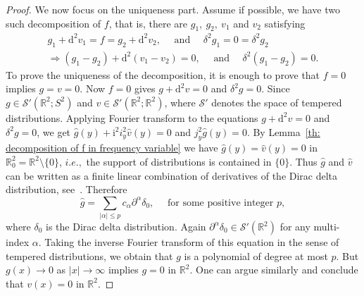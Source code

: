\documentclass[11pt]{article}
\newcommand{\I}{\mathrm{i}}
\newcommand{\D}{\mathrm{d}}
\newcommand{\PD}{\partial}
\newcommand{\Rb}{\mathbb{R}}
\renewcommand{\d}{\mathrm{d}}
\begin{document}
\begin{proof}
 We now focus on the uniqueness part.
 Assume if possible, we have two such decomposition of $f$, that is, there are $g_1,\  g_2, \ v_1$ and $v_2$ satisfying 
\begin{align*}
    g_1 + \D^2 v_1 =  f =     g_2 + \D^2 v_2, \quad \mbox{ and } \quad  \delta^{2}g_1=0 =   \delta^{2}g_2\\
 \Rightarrow   (g_1 -g_2) + \D^2 (v_1 -v_2) =  0, \quad \mbox{ and } \quad  \delta^{2}(g_1-g_2)=0.
\end{align*}
To prove the uniqueness of the decomposition, it is enough to prove that  $ f=0 $ implies  $ g=v=0 $. Now $f=0$ gives $ g+\d^{2}v=0 $ and $ \delta^{2}g=0 $. Since $ g \in \mathcal{S}'(\mathbb{R}^2;S^2) $ and $ v\in \mathcal{S}'(\mathbb{R}^2;\Rb^2) $, where $ \mathcal{S}' $ denotes the space of tempered distributions. Applying Fourier transform  to the equations $ g+\d^{2}v=0 $ and $ \delta^{2}g=0 $, we get $ \widehat{g}(y)+ \I^{2} i_y^2\widehat{v}(y)=0 $ and $ j_y^{2} \widehat{g}(y)=0$. By Lemma~\ref{th: decomposition of f in frequency variable} we have $ \widehat{g}(y)=\widehat{v}(y)=0 $ in $ \Rb^2_0= \Rb^2\setminus\{0\} $, $i.e., $ the support of distributions is contained in $ \{0\}.$ Thus $ \widehat{g} $ and $ \widehat{v} $ can be written as a finite linear combination of derivatives of the Dirac delta distribution, see~\cite[Theorem 3.2.1]{Friedlander}.
Therefore
 \[ \widehat{g} = \sum\limits_{|\alpha|\le p} c_{\alpha} \PD^{\alpha} \delta_{0}, \quad \mbox{ for some positive integer } p, \] 
 where $ \delta_0 $ is the Dirac delta distribution. 
 Again $ \PD^{\alpha}\delta_0 \in \mathcal{S}'(\Rb^2)$ for any multi-index $ \alpha $. Taking the inverse Fourier transform of this equation in the sense of tempered distributions, we obtain that $ g$ is a polynomial of degree at most $ p$. But $ g(x) \rightarrow 0$ as $ |x| \rightarrow \infty$  implies $ g = 0 $ in $ \Rb^2 $.
One can argue similarly and conclude that $ v(x) =0$ in $ \Rb^2 $. \smallskip


\end{proof}
\end{document}
